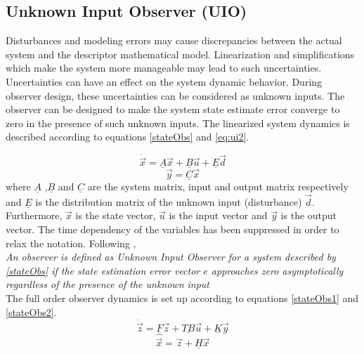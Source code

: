 \subsection{Unknown Input Observer (UIO)} \label{sec:UIO}
Disturbances and modeling errors may cause discrepancies between the actual system and the descriptor mathematical model. Linearization and simplifications which make the system more manageable may lead to such uncertainties. Uncertainties can have an effect on the system dynamic behavior. During observer design, these uncertainties can be considered as unknown inputs. The observer can be designed to make the system state estimate error converge to zero in the presence of such unknown inputs. The linearized system dynamics is described according to equations \ref{stateObs} and \ref{eq:ui2}.
  

%


\begin{equation}
\dot{\vec{x}} = \underline A\vec{x}+\underline B \vec{u}+\underline E\vec{d}
\label{stateObs}
\end{equation}
\begin{equation}
\vec{y} = \underline C \vec{x}
\label{eq:ui2}
\end{equation}
%
where $\underline A$ ,$\underline B$ and $ \underline C $ are the system matrix, input and output matrix respectively and $\underline E$ is the distribution matrix of the unknown input (disturbance) $\vec{d}$. Furthermore, $\vec{x}$ is the state vector, $\vec{u}$ is the input vector and $\vec{y}$ is the output vector. The time dependency of the variables has been suppressed in order to relax the notation. Following \cite{UIO}, 
%
%
\\
\textit{An observer is defined as Unknown Input Observer for a system described by \eqref{stateObs} if the state estimation error vector $e$ approaches zero asymptotically regardless of the presence of the unknown input }
\\
The full order observer dynamics is set up according to equations \ref{stateObs1} and \ref{stateObs2}.
\begin{equation}
\dot{\vec{z}} = \underline F\vec{z}+\underline{TB} \vec{u}+\underline K\vec{y}
\label{stateObs1}
\end{equation}
\begin{equation}
\hat{\vec{x}} = \vec{z} + \underline H \vec{x}
\label{stateObs2}
\end{equation}

